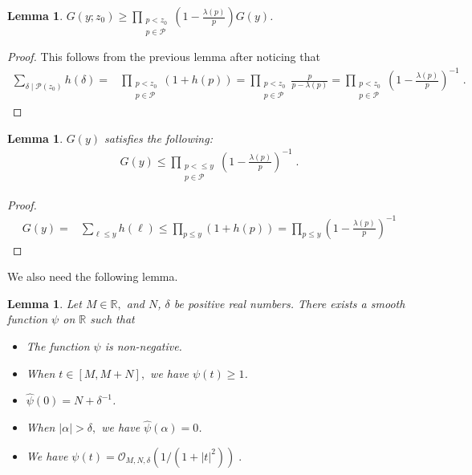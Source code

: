 \documentclass[12pt,article]{amsart}
\newtheorem{lemma}[theorem]{Lemma}
\theoremstyle{remark}
\numberwithin{equation}{section}
\newcommand{\R}{\mathbb{R}}
\begin{document}
	
	\begin{lemma}
		\label{g(z;z_0)}
		$G(y;z_0)\geq \prod_{\substack{p<z_0\\ p\in \mathcal{P}}}\left(1-\frac{\lambda(p)}{p}\right) G(y)$.
	\end{lemma}
	\begin{proof}
		This follows from the previous lemma after noticing that
		\begin{align*}
			\sum_{\delta\mid \mathcal{P}(z_0)}h(\delta)=&\prod_{\substack{p<z_0\\ p\in \mathcal{P}}}(1+h(p))
			= \prod_{\substack{p<z_0\\ p\in \mathcal{P}}}\frac{p}{p-\lambda(p)}
			=\prod_{\substack{p<z_0\\ p\in \mathcal{P}}}\left(1-\frac{\lambda(p)}{p}\right)^{-1}\; .
		\end{align*}
	\end{proof}
	\begin{lemma}
		\label{lowerGz}
		$G(y)$ satisfies the following:
		\begin{align}\label{G(z) upper bound}
			G(y)\leq \prod_{\substack{p<\leq y\\ p\in \mathcal{P}}} \left(1-\frac{\lambda(p)}{p}\right)^{-1}\;.
		\end{align}
	\end{lemma}
	\begin{proof}
		
		\begin{align*}
			G(y)=&\sum_{\ell\leq y}h(\ell)
			\leq  \prod_{p\leq y} \left(1+h(p)\right)
			= \prod_{p\leq y} \left(1-\frac{\lambda(p)}{p}\right)^{-1}
		\end{align*}
	\end{proof}
	
	\noindent
	We also need the following lemma.
	
	\begin{lemma}\cite[Lemma 3.3]{ramare24}
		\label{ramare24}
		Let $M\in\mathbb{R},$ and $N$, $\delta$ be positive real numbers. There exists a smooth function $\psi$ on $\R$ such that 
		\begin{itemize}
			\item The function $\psi$ is non-negative.
			\item When $t\in[M,M+N],$ we have $\psi(t)\geq 1$.
			\item $\widehat{\psi}(0)=N+\delta^{-1}$.
			\item When $|\alpha|>\delta,$ we have $\widehat{\psi}(\alpha)=0$.
			\item We have $\psi(t)=\mathcal{O}_{M,N,\delta}(1/(1+|t|^2))\;.$
		\end{itemize}
	\end{lemma}
	
\end{document}
